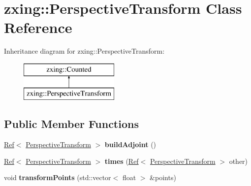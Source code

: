 \hypertarget{classzxing_1_1_perspective_transform}{}\section{zxing\+:\+:Perspective\+Transform Class Reference}
\label{classzxing_1_1_perspective_transform}
Inheritance diagram for zxing\+:\+:Perspective\+Transform\+:\begin{figure}[H]
\begin{center}
\leavevmode
\includegraphics[height=2.000000cm]{classzxing_1_1_perspective_transform}
\end{center}
\end{figure}
\subsection*{Public Member Functions}
\begin{DoxyCompactItemize}
\item 
\mbox{\label{classzxing_1_1_perspective_transform_aeb5bb7d617959c00786f91296e2726c3}} 
\mbox{\hyperlink{classzxing_1_1_ref}{Ref}}$<$ \mbox{\hyperlink{classzxing_1_1_perspective_transform}{Perspective\+Transform}} $>$ {\bfseries build\+Adjoint} ()
\item 
\mbox{\label{classzxing_1_1_perspective_transform_a3062991fd09a81d7b685ed0298ce64b7}} 
\mbox{\hyperlink{classzxing_1_1_ref}{Ref}}$<$ \mbox{\hyperlink{classzxing_1_1_perspective_transform}{Perspective\+Transform}} $>$ {\bfseries times} (\mbox{\hyperlink{classzxing_1_1_ref}{Ref}}$<$ \mbox{\hyperlink{classzxing_1_1_perspective_transform}{Perspective\+Transform}} $>$ other)
\item 
\mbox{\label{classzxing_1_1_perspective_transform_a16059a8aec2b31fb7f33cc3c925f558c}} 
void {\bfseries transform\+Points} (std\+::vector$<$ float $>$ \&points)
\end{DoxyCompactItemize}

